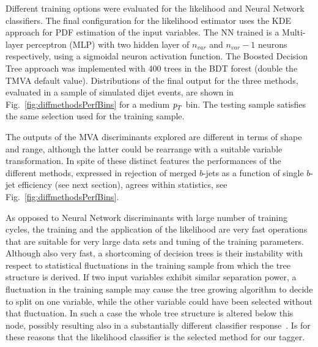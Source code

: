 Different training options were evaluated for the likelihood and Neural Network classifiers. The final configuration for the likelihood estimator uses the KDE approach for PDF estimation of the input variables. The NN trained is a Multi-layer perceptron (MLP) with two hidden layer of $n_{var}$ and $n_{var}-1$ neurons respectively, using a sigmoidal neuron activation function. The Boosted Decision Tree approach was implemented with 400 trees in the BDT forest (double the TMVA default value).  Distributions of the final output for the three methods, evaluated in a sample of simulated dijet events, are shown in Fig.~\ref{fig:diffmethodsPerfBins} for a medium ${\emph{p}_{T}}$ bin.  The testing sample satisfies the same selection used for the training sample.

The outputs of the MVA discriminants explored are different in terms of shape and range, although the latter could be rearrange with a suitable variable transformation.  In spite of these distinct features the performances of the different methods, expressed in rejection of merged $b$-jets as a function of single $b$-jet efficiency (see next section), agrees within statistics, see Fig.~\ref{fig:diffmethodsPerfBins}.  

As opposed to Neural Network discriminants with large number of training cycles, the training and the application of the likelihood are very fast operations that are suitable for very large data sets and tuning of the training parameters. Although also very fast, a shortcoming of decision trees is their instability with respect to statistical fluctuations in the training sample from which the tree structure is derived. If two input variables exhibit similar separation power, a fluctuation in the training sample may cause the tree growing algorithm to decide to split on one variable, while the other variable could have been selected without that fluctuation. In such a case the whole tree structure is altered below this node, possibly resulting also in a substantially different classifier response~\cite{Hocker:2007ht}. Is for these reasons that the likelihood classifier is the selected method for our tagger.

